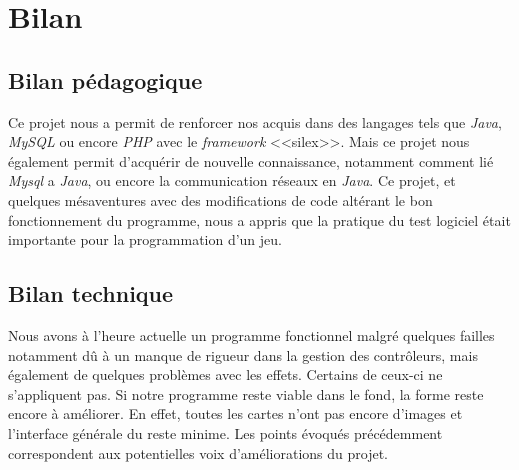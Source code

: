 \documentclass[a4paper,11pt]{report}
\begin{document}
  
  \chapter{Bilan}
    \section{Bilan pédagogique}
      Ce projet nous a permit de renforcer nos acquis dans des langages tels que \textit{Java}, \textit{MySQL} ou encore \textit{PHP} avec le \textit{framework} <<silex>>. Mais ce projet nous également permit d'acquérir de nouvelle connaissance, notamment comment lié \textit{Mysql} a \textit{Java}, ou encore la communication réseaux en \textit{Java}. Ce projet, et quelques mésaventures avec des modifications de code altérant le bon fonctionnement du programme, nous a appris que la pratique du test logiciel était importante pour la programmation d'un jeu.
      
    \section{Bilan technique}
       Nous avons à l'heure actuelle un programme fonctionnel malgré quelques failles notamment dû à un manque de rigueur dans la gestion des contrôleurs, mais également de quelques problèmes avec les effets. Certains de ceux-ci ne s'appliquent pas. Si notre programme reste viable dans le fond, la forme reste encore à améliorer. En effet, toutes les cartes n'ont pas encore d'images et l'interface générale du reste minime. Les points évoqués précédemment correspondent aux potentielles voix d'améliorations du projet.
\end{document}
